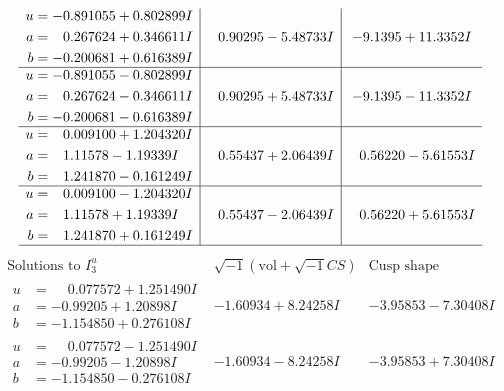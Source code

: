 \documentclass[1p]{elsarticle_modified}
\theoremstyle{definition}
\newcommand{\I}{\sqrt{-1}}
\begin{document}
$$\begin{array}{c|c|c}
\begin{aligned}
u &= -0.891055 + 0.802899 I \\
a &= \phantom{-}0.267624 + 0.346611 I \\
b &= -0.200681 + 0.616389 I\end{aligned}
 & \phantom{-}0.90295 - 5.48733 I & -9.1395 + 11.3352 I \\ \hline\begin{aligned}
u &= -0.891055 - 0.802899 I \\
a &= \phantom{-}0.267624 - 0.346611 I \\
b &= -0.200681 - 0.616389 I\end{aligned}
 & \phantom{-}0.90295 + 5.48733 I & -9.1395 - 11.3352 I \\ \hline\begin{aligned}
u &= \phantom{-}0.009100 + 1.204320 I \\
a &= \phantom{-}1.11578 - 1.19339 I \\
b &= \phantom{-}1.241870 - 0.161249 I\end{aligned}
 & \phantom{-}0.55437 + 2.06439 I & \phantom{-}0.56220 - 5.61553 I \\ \hline\begin{aligned}
u &= \phantom{-}0.009100 - 1.204320 I \\
a &= \phantom{-}1.11578 + 1.19339 I \\
b &= \phantom{-}1.241870 + 0.161249 I\end{aligned}
 & \phantom{-}0.55437 - 2.06439 I & \phantom{-}0.56220 + 5.61553 I\\
 \hline 
 \end{array}$$\newpage$$\begin{array}{c|c|c}  
\text{Solutions to }I^u_{3}& \I (\text{vol} + \sqrt{-1}CS) & \text{Cusp shape}\\
 \hline 
\begin{aligned}
u &= \phantom{-}0.077572 + 1.251490 I \\
a &= -0.99205 + 1.20898 I \\
b &= -1.154850 + 0.276108 I\end{aligned}
 & -1.60934 + 8.24258 I & -3.95853 - 7.30408 I \\ \hline\begin{aligned}
u &= \phantom{-}0.077572 - 1.251490 I \\
a &= -0.99205 - 1.20898 I \\
b &= -1.154850 - 0.276108 I\end{aligned}
 & -1.60934 - 8.24258 I & -3.95853 + 7.30408 I \\ \hline\begin{aligned}

\end{aligned}
\end{array}$$
\end{document}
